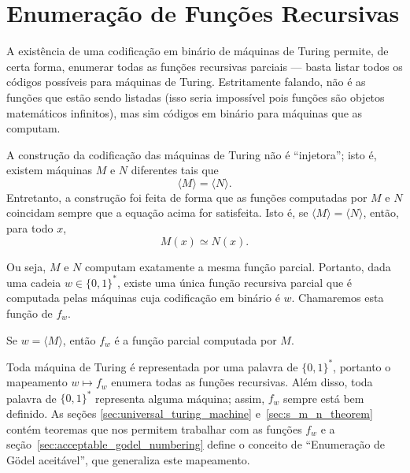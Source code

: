 \section{Enumeração de Funções Recursivas}
\label{sec:definition_enumeration_of_recursive_functions}

A existência de uma codificação em binário de máquinas de Turing
permite, de certa forma,
enumerar todas as funções recursivas parciais
--- basta listar todos os códigos possíveis para máquinas de Turing.
Estritamente falando,
não é as funções que estão sendo listadas
(isso seria impossível pois funções são objetos matemáticos infinitos),
mas sim códigos em binário para máquinas que as computam.

A construção da codificação das máquinas de Turing não é ``injetora'';
isto é, existem máquinas $M$ e $N$ diferentes
tais que
\begin{equation*}
    \langle M \rangle = \langle N \rangle.
\end{equation*}
Entretanto,
a construção foi feita de forma que
as funções computadas por $M$ e $N$ coincidam
sempre que a equação acima for satisfeita.
Isto é,
se $\langle M \rangle = \langle N \rangle$,
então, para todo $x$,
\begin{equation*}
    M(x) \simeq N(x).
\end{equation*}

Ou seja,
$M$ e $N$ computam exatamente a mesma função parcial.
Portanto,
dada uma cadeia $w \in \{0, 1\}^*$,
existe uma única função recursiva parcial
que é computada pelas máquinas cuja codificação em binário é $w$.
Chamaremos esta função de $f_w$.

\begin{notation}
    Se $w = \langle M \rangle$, então $f_w$ é a função parcial computada por $M$.
\end{notation}

Toda máquina de Turing é representada por uma palavra de $\{0, 1\}^*$,
portanto o mapeamento $w \mapsto f_w$
enumera todas as funções recursivas.
Além disso,
toda palavra de $\{0, 1\}^*$ representa alguma máquina;
assim, $f_w$ sempre está bem definido.
As seções \ref{sec:universal_turing_machine} e~\ref{sec:s_m_n_theorem}
contém teoremas que nos permitem trabalhar com as funções $f_w$
e a seção~\ref{sec:acceptable_godel_numbering}
define o conceito de ``Enumeração de Gödel aceitável'',
que generaliza este mapeamento.
